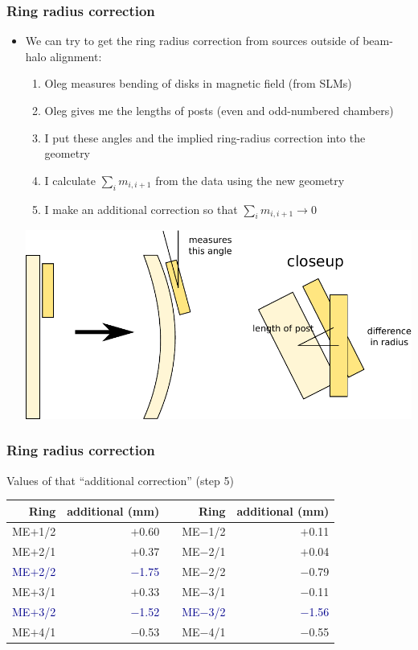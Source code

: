 \documentclass[compress]{beamer}
\begin{document}
\begin{frame}
\frametitle{Ring radius correction}
\begin{itemize}
\item We can try to get the ring radius correction from sources
  outside of beam-halo alignment:
\begin{enumerate}
  \item Oleg measures bending of disks in magnetic field (from SLMs)
  \item Oleg gives me the lengths of posts (even and odd-numbered chambers)
  \item I put these angles and the implied ring-radius correction into the geometry
  \item I calculate $\sum_i m_{i,i+1}$ from the data using the new geometry
  \item I make an additional correction so that $\sum_i m_{i,i+1} \to 0$
\end{enumerate}

\includegraphics[width=0.9\linewidth]{ring_radius_correction.pdf}
\end{itemize}
\end{frame}

\begin{frame}
\frametitle{Ring radius correction}

Values of that ``additional correction'' (step 5)

\vfill
\renewcommand{\arraystretch}{1.3}
\begin{tabular}{r r p{1 cm} r r}
Ring & additional (mm) & & Ring & additional (mm) \\\hline
ME$+$1/2 &          $+$0.60 &&    ME$-$1/2 &          $+$0.11 \\
ME$+$2/1 &          $+$0.37 &&    ME$-$2/1 &          $+$0.04 \\
\textcolor{darkblue}{ME$+$2/2} &          \textcolor{darkblue}{$-$1.75} &&    ME$-$2/2 &          $-$0.79 \\
ME$+$3/1 &          $+$0.33 &&    ME$-$3/1 &          $-$0.11 \\
\textcolor{darkblue}{ME$+$3/2} &          \textcolor{darkblue}{$-$1.52} &&    \textcolor{darkblue}{ME$-$3/2} &          \textcolor{darkblue}{$-$1.56} \\
ME$+$4/1 &          $-$0.53 &&    ME$-$4/1 &          $-$0.55 \\
\end{tabular}
\end{frame}
\end{document}

